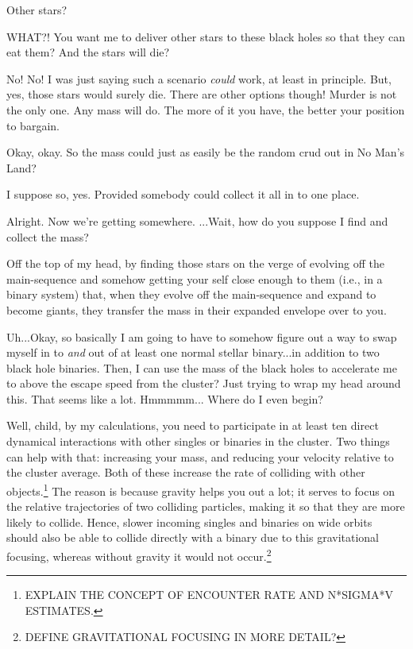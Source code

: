\documentclass[main.tex]{subfiles}
\begin{document}
\newpara \Enrico Other stars?

\newpara \Sterope WHAT?! You want me to deliver other stars to these black holes so that they can eat them?  And the stars will die?

\newpara \Enrico No! No! I was just saying such a scenario \textit{could} work, at least in principle.  But, yes, those stars would surely die.  There are other options though!  Murder is not the only one.  Any mass will do.  The more of it you have, the better your position to bargain.

\newpara \Sterope Okay, okay. So the mass could just as easily be the random crud out in No Man's Land?

\newpara \Enrico I suppose so, yes.  Provided somebody could collect it all in to one place.

\newpara \Sterope Alright.  Now we're getting somewhere.  ...Wait, how do you suppose I find and collect the mass?

\newpara \Enrico Off the top of my head, by finding those stars on the verge of evolving off the main-sequence and somehow getting your self close enough to them (i.e., in a binary system) that, when they evolve off the main-sequence and expand to become giants, they transfer the mass in their expanded envelope over to you.

\newpara \Sterope  Uh...Okay, so basically I am going to have to somehow figure out a way to swap myself in to \textit{and} out of at least one normal stellar binary...in addition to two black hole binaries.  Then, I can use the mass of the black holes to accelerate me to above the escape speed from the cluster?  Just trying to wrap my head around this.  That seems like a lot.  Hmmmmm... Where do I even begin?

\newpara \Enrico Well, child, by my calculations, you need to participate in at least ten direct dynamical interactions with other singles or binaries in the cluster.  Two things can help with that:  increasing your mass, and reducing your velocity relative to the cluster average.  Both of these increase the rate of colliding with other objects.\footnote{EXPLAIN THE CONCEPT OF ENCOUNTER RATE AND N*SIGMA*V ESTIMATES.}  The reason is because gravity helps you out a lot; it serves to focus on the relative trajectories of two colliding particles, making it so that they are more likely to collide.  Hence, slower incoming singles and binaries on wide orbits should also be able to collide directly with a binary due to this gravitational focusing, whereas without gravity it would not occur.\footnote{DEFINE GRAVITATIONAL FOCUSING IN MORE DETAIL?}
\end{document}
